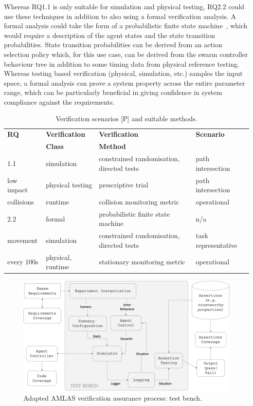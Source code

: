\documentclass[lettersize,journal]{IEEEtran}
\begin{document}
Whereas RQ1.1 is only suitable for simulation and physical testing, RQ2.2 could use these techniques in addition to also using a formal verification analysis. A formal analysis could take the form of a probabilistic finite state machine~\cite{Calinescu2018}, which would require a description of the agent states and the state transition probabilities. State transition probabilities can be derived from an action selection policy which, for this use case, can be derived from the swarm controller behaviour tree in addition to some timing data from physical reference testing. Whereas testing based verification (physical, simulation, etc.) samples the input space, a formal analysis can prove a system property across the entire parameter range, which can be particularly beneficial in giving confidence in system compliance against the requirements. 
\begin{table}[!t]
	\caption{Verification scenarios [P] and suitable methods.}\label{tab:testgen}
	\centering
	\begin{tabular}{llll}
		\textbf{RQ}   & \textbf{Verification}  & \textbf{Verification} & \textbf{Scenario} \\ 
		& \textbf{Class}         & \textbf{Method}		  & 		          \\ 
		\hline
		1.1 	      & simulation 	   & constrained randomisation, directed tests & path intersection     \\
		low impact    & physical testing   & prescriptive trial 				       & path intersection	 \\
		collisions    & runtime		   & collision monitoring metric 		       & operational		 \\
		\hline
		2.2 	      & formal 	 	   & probabilistic finite state machine 	   & n/a      \\
		movement      & simulation 	   & constrained randomisation, directed tests & task representative     \\
		every 100s    & physical, runtime  & stationary monitoring metric 			   & operational		 \\
		\hline
	\end{tabular}
\end{table}
\begin{figure}[!t]
	\centering
	\includegraphics[width=1.0\textwidth]{figures/verification-testbench.png}
	\caption{Adapted AMLAS verification assurance process: test bench.}
	\label{amlas-a-testbench}
\end{figure}
\\
\end{document}
